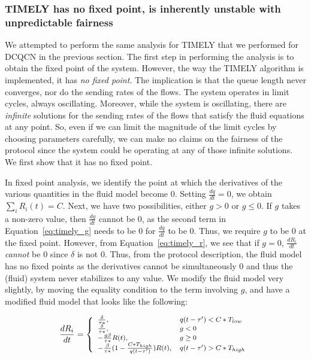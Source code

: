 \subsubsection{TIMELY has no fixed point, is inherently unstable with
unpredictable fairness}
We attempted to perform the same analysis for TIMELY that we performed for DCQCN
in the previous section.  The first step in performing the analysis is to obtain
the fixed point of the system.  However, the way the TIMELY algorithm is
implemented, it has \emph{no fixed point}. The implication is that the queue
length never converges, nor do the sending rates of the flows. The system
operates in limit cycles, always oscillating. Moreover, while the system is
oscillating, there are \emph{infinite} solutions for the sending rates of the
flows that satisfy the fluid equations at any point. So, even if we can limit
the magnitude of the limit cycles by choosing parameters carefully, we can make
no claims on the fairness of the protocol since the system could be operating at
any of those infinite solutions. We first show that it has no fixed point.

In fixed point analysis, we identify the point at which the derivatives of the
various quantities in the fluid model become 0.  Setting $\tfrac{dq}{dt} = 0$,
we obtain $\sum_{i} R_i(t) = C$. Next, we have two possibilities, either $g > 0$
or $g  \le 0$. If $g$ takes a non-zero value, then $\tfrac{dg}{dt}$ cannot be 0,
as the second term in Equation~\ref{eq:timely_g} needs to be 0 for
$\tfrac{dq}{dt}$ to be 0. Thus, we require $g$ to be 0 at the fixed point.
However, from Equation~\ref{eq:timely_r}, we see that if $g = 0$,
$\tfrac{dR_i}{dt}$ \emph{cannot} be 0 since $\delta$ is not 0. Thus, from the
protocol description, the fluid model has no fixed points as the derivatives
cannot be simultaneously 0 and thus the (fluid) system never stabilizes to any
value. We modify the fluid model very slightly, by moving the equality condition
to the term involving $g$, and have a modified fluid model that looks like the
following:

\begin{equation}
\small
\frac{{dR_i}}{{dt}} = \left\{ \begin{array}{ll}
\frac{\delta }{{\tau *}}, & q(t - \tau ') < C*{T_{low}}\\
\frac{\delta }{{\tau *}}, & g < 0\\
 - \frac{{g\beta }}{{\tau *}}R(t), & g \ge 0\\
 - \frac{\beta }{{\tau *}}(1 - \frac{{C*{T_{high}}}}{{q(t - \tau ')}})R(t), & q(t - \tau ') > C*{T_{high}}
\end{array} \right.\\
\label{eq:timely_r_modified}
\end{equation}

